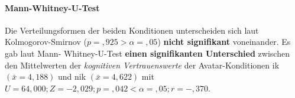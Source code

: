 \documentclass[a4paper,11pt]{article}%
\renewcommand{\\}{\vspace*{0.5\baselineskip} \newline}
\begin{document}
{\paragraph{Mann-Whitney-U-Test}
Die Verteilungsformen der beiden Konditionen unterscheiden sich laut Kolmogorov-Smirnov ($p =,925 > \alpha =,05$) \textbf{nicht signifikant} voneinander. Es gab laut Mann- Whitney-U-Test \textbf{einen signifikanten Unterschied} zwischen den Mittelwerten der \textit{kognitiven Vertrauenswerte} der Avatar-Konditionen \ac{ik} $(\bar{x} = 4,188)$ und \ac{nik} $(\bar{x} = 4,622)$ mit $U = 64,000; Z = -2,029; p =,042 < \alpha =,05; r =-,370$. \\

}
\end{document}
